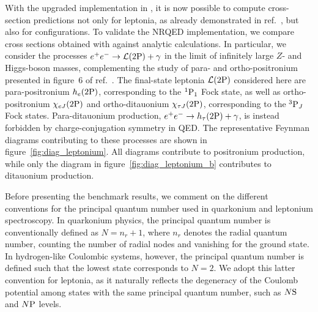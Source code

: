 With the upgraded implementation in {\madsons}, it is now possible to compute cross-section predictions not only for \swavetxt{} leptonia, as already demonstrated in ref.~\cite{ColpaniSerri:2025vdz}, but also for \pwavetxt{} configurations. To validate the NRQED implementation, we compare cross sections obtained with \mgshort{} against analytic calculations. In particular, we consider the processes $e^+e^- \to {\cal L}(2\mathrm{P})+\gamma$ in the limit of infinitely large $Z$- and Higgs-boson masses, complementing the study of \swavetxt{} para- and ortho-positronium presented in figure~6 of ref.~\cite{ColpaniSerri:2025vdz}. The final-state leptonia ${\cal L}(2\mathrm{P})$ considered here are para-positronium $h_e(2\mathrm{P})$, corresponding to the ${}^1\mathrm{P}_1$ Fock state, as well as ortho-positronium $\chi_{eJ}(2\mathrm{P})$ and ortho-ditauonium $\chi_{\tau J}(2\mathrm{P})$, corresponding to the ${}^3\mathrm{P}_J$ Fock states. Para-ditauonium production, $e^+e^-\to h_\tau(2\mathrm{P})+\gamma$, is instead forbidden by charge-conjugation symmetry in QED.
The representative Feynman diagrams contributing to these processes are shown in figure~\ref{fig:diag_leptonium}. All diagrams contribute to positronium production, while only the diagram in figure~\ref{fig:diag_leptonium_b} contributes to ditauonium production.

Before presenting the benchmark results, we comment on the different conventions for the principal quantum number used in quarkonium and leptonium spectroscopy. In quarkonium physics, the principal quantum number is conventionally defined as $N=n_r+1$, where $n_r$ denotes the radial quantum number, counting the number of radial nodes and vanishing for the ground state. In hydrogen-like Coulombic systems, however, the principal quantum number is defined such that the lowest \pwavetxt{} state corresponds to $N=2$. We adopt this latter convention for leptonia, as it naturally reflects the degeneracy of the Coulomb potential among states with the same principal quantum number, such as $N\mathrm{S}$ and $N\mathrm{P}$ levels.


